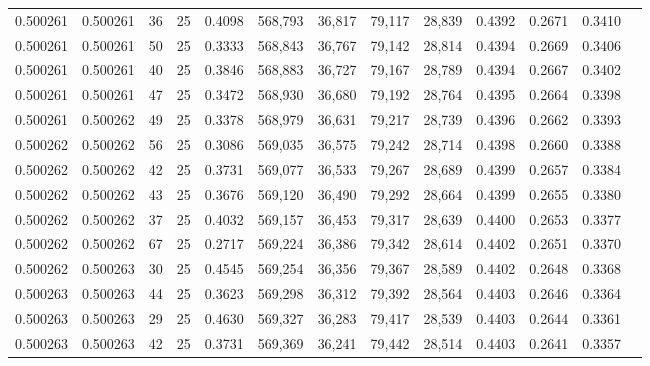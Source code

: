 \begin{tabular}{rrrrrrrrrrrrr}
0.500261 & 0.500261 &    36 &  25 &                                     0.4098 & 568,793 &  36,817 &  79,117 &  28,839 & 0.4392 & 0.2671 & 0.3410 \\
0.500261 & 0.500261 &    50 &  25 &                                     0.3333 & 568,843 &  36,767 &  79,142 &  28,814 & 0.4394 & 0.2669 & 0.3406 \\
0.500261 & 0.500261 &    40 &  25 &                                     0.3846 & 568,883 &  36,727 &  79,167 &  28,789 & 0.4394 & 0.2667 & 0.3402 \\
0.500261 & 0.500261 &    47 &  25 &                                     0.3472 & 568,930 &  36,680 &  79,192 &  28,764 & 0.4395 & 0.2664 & 0.3398 \\
0.500261 & 0.500262 &    49 &  25 &                                     0.3378 & 568,979 &  36,631 &  79,217 &  28,739 & 0.4396 & 0.2662 & 0.3393 \\
0.500262 & 0.500262 &    56 &  25 &                                     0.3086 & 569,035 &  36,575 &  79,242 &  28,714 & 0.4398 & 0.2660 & 0.3388 \\
0.500262 & 0.500262 &    42 &  25 &                                     0.3731 & 569,077 &  36,533 &  79,267 &  28,689 & 0.4399 & 0.2657 & 0.3384 \\
0.500262 & 0.500262 &    43 &  25 &                                     0.3676 & 569,120 &  36,490 &  79,292 &  28,664 & 0.4399 & 0.2655 & 0.3380 \\
0.500262 & 0.500262 &    37 &  25 &                                     0.4032 & 569,157 &  36,453 &  79,317 &  28,639 & 0.4400 & 0.2653 & 0.3377 \\
0.500262 & 0.500262 &    67 &  25 &                                     0.2717 & 569,224 &  36,386 &  79,342 &  28,614 & 0.4402 & 0.2651 & 0.3370 \\
0.500262 & 0.500263 &    30 &  25 &                                     0.4545 & 569,254 &  36,356 &  79,367 &  28,589 & 0.4402 & 0.2648 & 0.3368 \\
0.500263 & 0.500263 &    44 &  25 &                                     0.3623 & 569,298 &  36,312 &  79,392 &  28,564 & 0.4403 & 0.2646 & 0.3364 \\
0.500263 & 0.500263 &    29 &  25 &                                     0.4630 & 569,327 &  36,283 &  79,417 &  28,539 & 0.4403 & 0.2644 & 0.3361 \\
0.500263 & 0.500263 &    42 &  25 &                                     0.3731 & 569,369 &  36,241 &  79,442 &  28,514 & 0.4403 & 0.2641 & 0.3357 \\

\end{tabular}
